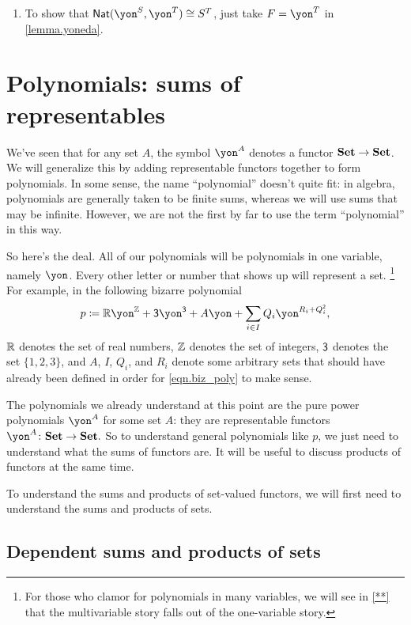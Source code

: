 \documentclass[Book-Poly]{subfiles}
\begin{document}
\begin{exercise}
\begin{solution}
\begin{enumerate}
    \item To show that $\nat(\yon^S, \yon^T) \iso S^T$, just take $F = \yon^T$ in \cref{lemma.yoneda}.
\end{enumerate}
\end{solution}
\end{exercise}

\section{Polynomials: sums of representables} \label{sec.poly.func_nat.repr_sum}

We've seen that for any set $A$, the symbol $\yon^A$ denotes a functor $\mathbf{Set}\to\mathbf{Set}$. We will generalize this by adding representable functors together to form polynomials. In some sense, the name ``polynomial'' doesn't quite fit: in algebra, polynomials are generally taken to be finite sums, whereas we will use sums that may be infinite. However, we are not the first by far to use the term ``polynomial'' in this way.

So here's the deal. All of our polynomials will be polynomials in one variable, namely $\yon$.
Every other letter or number that shows up will represent a set.%
\footnote{For those who clamor for polynomials in many variables, we will see in \cref{**} that the multivariable story falls out of the one-variable story.}
For example, in the following bizarre polynomial
\begin{equation}\label{eqn.biz_poly}
p\coloneqq\rr\yon^\zz+\3\yon^{\3}+A\yon+\sum_{i\in I}Q_i\yon^{R_i+Q_i^\2},
\end{equation}
$\mathbb{R}$ denotes the set of real numbers, $\mathbb{Z}$ denotes the set of integers, $\textsf{3}$ denotes the set $\{1,2,3\}$, and $A$, $I$, $Q_i$, and $R_i$ denote some arbitrary sets that should have already been defined in order for \eqref{eqn.biz_poly} to make sense.

The polynomials we already understand at this point are the pure power polynomials $\yon^A$ for some set $A$: they are representable functors $\yon^A\colon\smset\to\smset.$
So to understand general polynomials like $p$, we just need to understand what the sums of functors are. It will be useful to discuss products of functors at the same time.

To understand the sums and products of set-valued functors, we will first need to understand the sums and products of sets.

\subsection{Dependent sums and products of sets} \label{subsec.poly.func_nat.repr_sum.dep_sum_prod_set}
\end{document}
